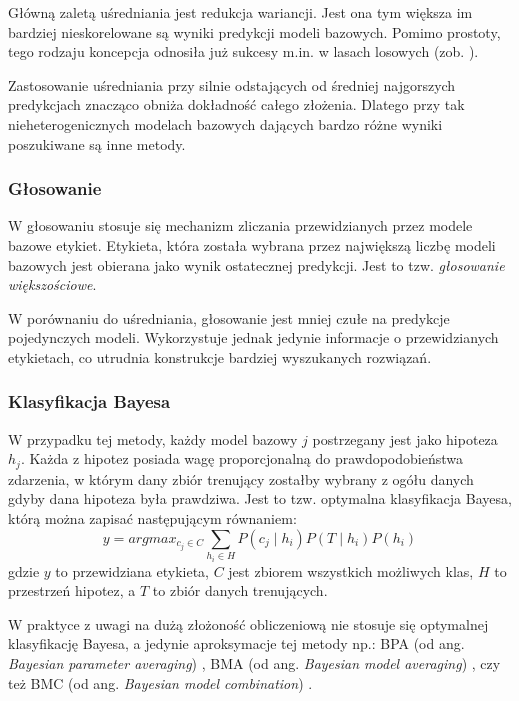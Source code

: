Główną zaletą uśredniania jest redukcja wariancji. Jest ona tym większa im bardziej nieskorelowane są wyniki predykcji modeli bazowych. Pomimo prostoty, tego rodzaju koncepcja odnosiła już sukcesy m.in. w lasach losowych (zob. \cite{Breiman2001}).

Zastosowanie uśredniania przy silnie odstających od średniej najgorszych predykcjach znacząco obniża dokładność całego złożenia. Dlatego przy tak nieheterogenicznych modelach bazowych dających bardzo różne wyniki poszukiwane są inne metody.

\subsubsection{Głosowanie}

W głosowaniu stosuje się mechanizm zliczania przewidzianych przez modele bazowe etykiet. Etykieta, która została wybrana przez największą liczbę modeli bazowych jest obierana jako wynik ostatecznej predykcji. Jest to tzw. \textit{głosowanie większościowe}.

W porównaniu do uśredniania, głosowanie jest mniej czułe na predykcje pojedynczych modeli. Wykorzystuje jednak jedynie informacje o przewidzianych etykietach, co utrudnia konstrukcje bardziej wyszukanych rozwiązań.

\subsubsection{Klasyfikacja Bayesa}

W przypadku tej metody, każdy model bazowy $j$ postrzegany jest jako hipoteza $h_j$. Każda z hipotez posiada wagę proporcjonalną do prawdopodobieństwa zdarzenia, w którym dany zbiór trenujący zostałby wybrany z ogółu danych gdyby dana hipoteza była prawdziwa. Jest to tzw. optymalna klasyfikacja Bayesa, którą można zapisać następującym równaniem:
\begin{equation}
y = arg max_{c_j \in C} \sum_{h_i \in H} P(c_j \mid h_i)P(T \mid h_i)P(h_i)
\end{equation}
gdzie $y$ to przewidziana etykieta, $C$ jest zbiorem wszystkich możliwych klas, $H$ to przestrzeń hipotez, a $T$ to zbiór danych trenujących.

W praktyce z uwagi na dużą złożoność obliczeniową nie stosuje się optymalnej klasyfikację Bayesa, a jedynie aproksymacje tej metody np.: BPA (od ang. \textit{Bayesian parameter averaging}) \cite{BPA}, BMA (od ang. \textit{Bayesian model averaging}) \cite{BMA}, czy też BMC (od ang. \textit{Bayesian model combination}) \cite{BMC}.

